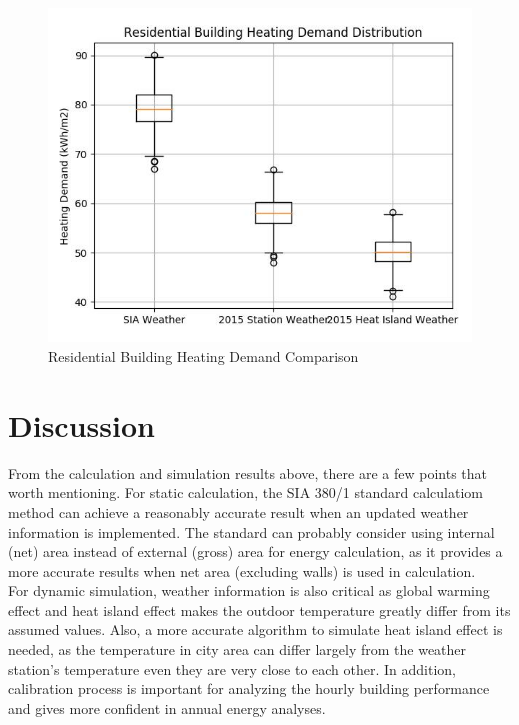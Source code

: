 \documentclass[a4paper, oneside]{discothesis}
\begin{document}
	    \begin{figure}[H]
		\centering
		\includegraphics[scale=0.63]{Hongg_Comparison.jpg}
		\caption{Residential Building Heating Demand Comparison}
		\label{fig:Hongg_Comp}
		\end{figure}
		


\chapter{Discussion}
    From the calculation and simulation results above, there are a few points that worth mentioning. For static calculation, the SIA 380/1 standard calculatiom method can achieve a reasonably accurate result when an updated weather information is implemented. The standard can probably consider using internal (net) area instead of external (gross) area for energy calculation, as it provides a more accurate results when net area (excluding walls) is used in calculation.\\
    
    For dynamic simulation, weather information is also critical as global warming effect and heat island effect makes the outdoor temperature greatly differ from its assumed values. Also, a more accurate algorithm to simulate heat island effect is needed, as the temperature in city area can differ largely from the weather station's temperature even they are very close to each other. In addition, calibration process is important for analyzing the hourly building performance and gives more confident in annual energy analyses.\\
    
\end{document}
